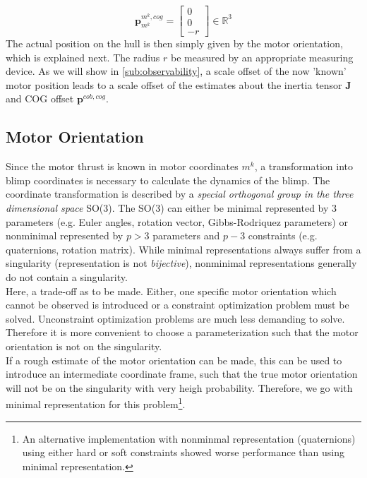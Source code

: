 \begin{equation}
\label{eq:motor_position}
\mathbf{p}^{m^k,cog}_{m^k}
=
\left[ \begin{array}{c}
0 \\
0 \\
-r
\end{array} \right]
\in \mathbb{R}^3
\end{equation}
The actual position on the hull is then simply given by the motor orientation, which is explained next.
The radius $r$ be measured by an appropriate measuring device.
As we will show in \cref{sub:observability}, a scale offset of the now 'known' motor position leads to a scale offset of the estimates about the inertia tensor $\mathbf{J}$ and COG offset $\mathbf{p}^{cob,cog}$.

\subsection{Motor Orientation}
\label{sub:par_orientation}
Since the motor thrust is known in motor coordinates $m^k$, a transformation into blimp coordinates is necessary to calculate the dynamics of the blimp.
The coordinate transformation is described by a \textit{special orthogonal group in the three dimensional space} SO(3).
The SO(3) can either be minimal represented by $3$ parameters 
(e.g. Euler angles, rotation vector, Gibbs-Rodriquez parameters) 
or nonminimal represented by $p>3$ parameters and $p-3$ constraints 
(e.g. quaternions, rotation matrix).
While minimal representations always suffer from a singularity (representation is not \textit{bijective}), nonminimal representations generally do not contain a singularity.
\\

Here, a trade-off as to be made.
Either, one specific motor orientation which cannot be observed is introduced or a constraint optimization problem must be solved.
Unconstraint optimization problems are much less demanding to solve.
Therefore it is more convenient to choose a parameterization such that the motor orientation is not on the singularity.\\
If a rough estimate of the motor orientation can be made, this can be used to introduce an intermediate coordinate frame, such that the true motor orientation will not be on the singularity with very heigh probability.
Therefore, we go with minimal representation for this problem\footnote{
An alternative implementation with nonminmal representation (quaternions) using either hard or soft constraints showed worse performance than using minimal representation.
}.

